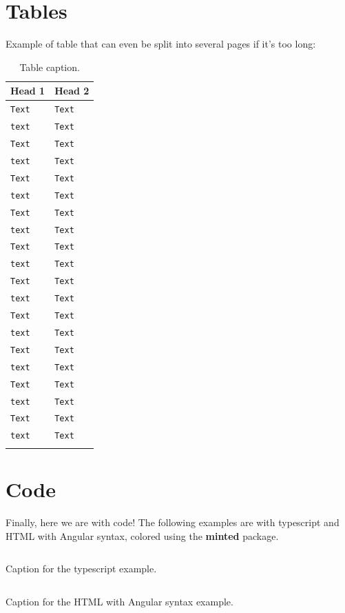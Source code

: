 \section{Tables}
Example of table that can even be split into several pages if it's too long:
\begin{longtable}[H]{| l | l |}
    \hline
     \rowcolor[HTML]{F87C58}\textbf{Head 1} & \textbf{Head 2}\\
    \hline
    \endfirsthead
    
    \texttt{Text} & \texttt{Text}\\
    \hline
    \texttt{text} & \texttt{Text}\\
    \hline
    \texttt{Text} & \texttt{Text}\\
    \hline
    \texttt{text} & \texttt{Text}\\
    \hline
    \texttt{Text} & \texttt{Text}\\
    \hline
    \texttt{text} & \texttt{Text}\\
    \hline
    \texttt{Text} & \texttt{Text}\\
    \hline
    \texttt{text} & \texttt{Text}\\
    \hline
    \texttt{Text} & \texttt{Text}\\
    \hline
    \texttt{text} & \texttt{Text}\\
    \hline
    \texttt{Text} & \texttt{Text}\\
    \hline
    \texttt{text} & \texttt{Text}\\
    \hline
    \texttt{Text} & \texttt{Text}\\
    \hline
    \texttt{text} & \texttt{Text}\\
    \hline
    \texttt{Text} & \texttt{Text}\\
    \hline
    \texttt{text} & \texttt{Text}\\
    \hline
    \texttt{Text} & \texttt{Text}\\
    \hline
    \texttt{text} & \texttt{Text}\\
    \hline
    \texttt{Text} & \texttt{Text}\\
    \hline
    \texttt{text} & \texttt{Text}\\
    \hline
    \caption{Table caption.}
\end{longtable}

\section{Code}
Finally, here we are with code! The following examples are with typescript and HTML with Angular syntax, colored using the \textbf{minted} package.

\begin{code}
    \inputminted{typescript}{listings/ts-example.ts}
    \caption{Caption for the typescript example.}
\end{code}
\vspace{4mm}

\begin{code}
    \inputminted{ng2}{listings/html-example.html}
    \caption{Caption for the HTML with Angular syntax example.}
\end{code}
\vspace{4mm}

